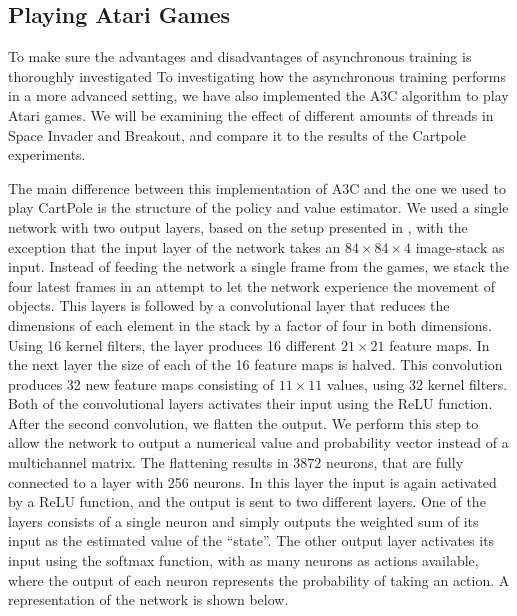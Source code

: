 \documentclass[11pt]{article}
\begin{document}
\subsection{Playing Atari Games}

To make sure the advantages and disadvantages of asynchronous training
is thoroughly investigated 
To investigating how the asynchronous training performs in
a more advanced setting, we have also implemented the A3C algorithm
to play Atari games.
We will be examining the effect of different amounts of threads
in Space Invader and Breakout, and compare it to the results
of the Cartpole experiments.

The main difference between this implementation of A3C
and the one we used to play CartPole is the structure of the
policy and value estimator.
We used a single network with two output layers,
based on the setup presented in \cite{dqn-nature}, with the
exception that the input layer of the network takes an $84 \times 84 \times 4$
image-stack as input.
Instead of feeding the network a single frame from the games,
we stack the four latest frames in an attempt to let the network
experience the movement of objects.
This layers is followed by a convolutional layer that reduces the dimensions
of each element in the stack by a factor of four in both dimensions.
Using 16 kernel filters, the layer produces 16 different
$21 \times 21$ feature maps.
In the next layer the size of each of the 16 feature maps is
halved.
This convolution produces 32 new feature maps consisting of $11 \times 11$ values,
using 32 kernel filters.
Both of the convolutional layers activates
their input using the ReLU function.
After the second convolution, we flatten the output.
We perform this step to allow the network to output a numerical value and
probability vector instead of a multichannel matrix.
The flattening results in $3872$ neurons, that are fully connected to
a layer with 256 neurons.
In this layer the input is again activated by a ReLU function,
and the output is sent to two different layers.
One of the layers consists of a single neuron
and simply outputs the weighted sum of its input as the estimated value
of the “state”.
The other output layer activates its input using the softmax function,
with as many neurons as actions available, where
the output of each neuron represents the probability of taking an action.
A representation of the network is shown below.
\end{document}
